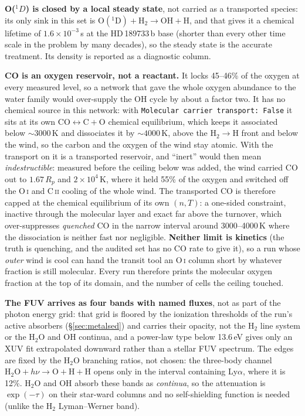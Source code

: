 \documentclass[english,a4paper]{my_memo}
\newcommand{\rp}{\ensuremath{R_p}}   %
\begin{document}
\textbf{O($^1D$) is closed by a local steady state}, not carried as a
transported species: its only sink in this set is
$\mathrm{O(^1D)} + \mathrm{H_2} \to \mathrm{OH} + \mathrm{H}$, and that gives it a chemical lifetime of
$1.6\times10^{-3}$\,s at the HD\,189733\,b base (shorter than every other
time scale in the problem by many decades), so the steady state is the
accurate treatment. Its density is reported as a diagnostic column.

\textbf{CO is an oxygen reservoir, not a reactant.} It locks 45--46\% of the
oxygen at every measured level, so a network that gave the whole oxygen
abundance to the water family would over-supply the OH cycle by about a factor
two. It has no chemical source in this network: with
\texttt{Molecular carrier transport: False} it sits at its own
$\mathrm{CO\leftrightarrow C+O}$ chemical equilibrium, which keeps it
associated below ${\sim}3000$\,K and dissociates it by ${\sim}4000$\,K, above
the H$_2\to$H front and below the wind, so the carbon and the oxygen of the
wind stay atomic. With the transport on it is a transported reservoir, and
``inert'' would then mean \emph{indestructible}: measured before the ceiling
below was added, the wind carried CO out to $1.67\,\rp$ and $2\times10^4$\,K,
where it held 55\% of the oxygen and switched off the O\,\textsc{i} and
C\,\textsc{ii} cooling of the whole wind. The transported CO is therefore
capped at the chemical equilibrium of its own $(n,T)$: a one-sided
constraint, inactive through the molecular layer and exact far above the
turnover, which over-suppresses \emph{quenched} CO in the narrow interval
around 3000--4000\,K where the dissociation is neither fast nor negligible.
\textbf{Neither limit is kinetics} (the truth is quenching, and the audited
set has no CO rate to give it), so a run whose \emph{outer} wind is cool can
hand the transit tool an O\,\textsc{i} column short by whatever fraction is
still molecular. Every run therefore prints the molecular oxygen fraction at
the top of its domain, and the number of cells the ceiling touched.

\textbf{The FUV arrives as four bands with named fluxes}, not as part of the
photon energy grid: that grid is floored by the ionization thresholds of the
run's active absorbers (\S\ref{sec:metalsed}) and carries their opacity, not
the H$_2$ line system or the H$_2$O and OH continua, and a power-law type
below 13.6\,eV gives only an XUV fit extrapolated downward rather than a
stellar FUV spectrum. The edges are fixed by the H$_2$O branching
ratios, not chosen: the three-body channel
$\mathrm{H_2O}+h\nu\to\mathrm{O+H+H}$ opens only in the interval containing
Ly$\alpha$, where it is 12\%. H$_2$O and OH absorb these bands as
\emph{continua}, so the
attenuation is $\exp(-\tau)$ on their star-ward columns and no self-shielding
function is needed (unlike the H$_2$ Lyman--Werner band).
\end{document}
